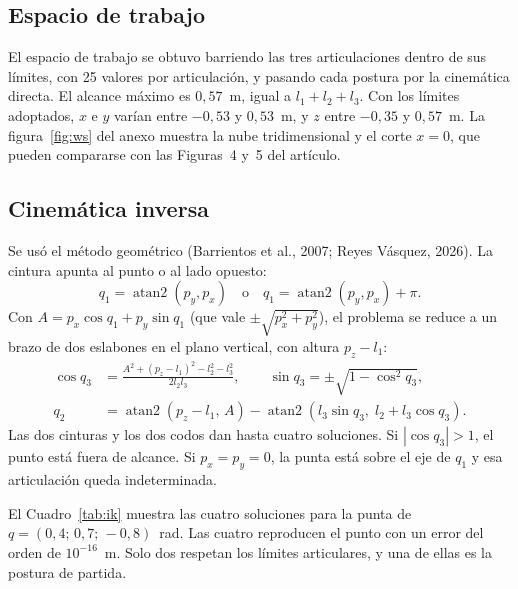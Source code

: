 \documentclass[11pt,a4paper]{article}
\begin{document}
\subsection{Espacio de trabajo}

El espacio de trabajo se obtuvo barriendo las tres articulaciones dentro de sus límites, con 25 valores por articulación, y pasando cada postura por la cinemática directa. El alcance máximo es \(0{,}57\)~m, igual a \(l_1+l_2+l_3\). Con los límites adoptados, \(x\) e \(y\) varían entre \(-0{,}53\) y \(0{,}53\)~m, y \(z\) entre \(-0{,}35\) y \(0{,}57\)~m. La figura~\ref{fig:ws} del anexo muestra la nube tridimensional y el corte \(x=0\), que pueden compararse con las Figuras~4 y~5 del artículo.

\subsection{Cinemática inversa}

Se usó el método geométrico (Barrientos et al., 2007; Reyes Vásquez, 2026). La cintura apunta al punto o al lado opuesto:
\begin{equation}
q_1=\operatorname{atan2}(p_y,p_x)\quad\text{o}\quad q_1=\operatorname{atan2}(p_y,p_x)+\pi .
\end{equation}
Con \(A=p_x\cos q_1+p_y\sin q_1\) (que vale \(\pm\sqrt{p_x^2+p_y^2}\)), el problema se reduce a un brazo de dos eslabones en el plano vertical, con altura \(p_z-l_1\):
\begin{align}
\cos q_3&=\frac{A^2+(p_z-l_1)^2-l_2^2-l_3^2}{2 l_2 l_3}, \qquad
\sin q_3=\pm\sqrt{1-\cos^2 q_3},\\
q_2&=\operatorname{atan2}(p_z-l_1,\,A)-\operatorname{atan2}(l_3\sin q_3,\;l_2+l_3\cos q_3).
\end{align}
Las dos cinturas y los dos codos dan hasta cuatro soluciones. Si \(|\cos q_3|>1\), el punto está fuera de alcance. Si \(p_x=p_y=0\), la punta está sobre el eje de \(q_1\) y esa articulación queda indeterminada.

El Cuadro~\ref{tab:ik} muestra las cuatro soluciones para la punta de \(q=(0{,}4;\,0{,}7;\,-0{,}8)\)~rad. Las cuatro reproducen el punto con un error del orden de \(10^{-16}\)~m. Solo dos respetan los límites articulares, y una de ellas es la postura de partida.
\end{document}
